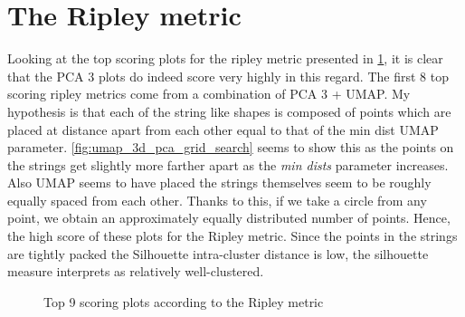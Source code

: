 \documentclass[a4paper, 12pt, twoside]{report}
\begin{document}
\section{The Ripley metric}

Looking at the top scoring plots for the ripley metric presented in \ref{fig:top_ripley}, it is clear that the PCA 3 plots do indeed score very highly in this regard. The first 8 top scoring ripley metrics come from a combination of PCA 3 + UMAP. My hypothesis is that each of the string like shapes is composed of points which are placed at distance apart from each other equal to that of the min dist UMAP parameter. \ref{fig:umap_3d_pca_grid_search} seems to show this as the points on the strings get slightly more farther apart as the \textit{min dists} parameter increases. Also UMAP seems to have placed the strings themselves seem to be roughly equally spaced from each other. Thanks to this, if we take a circle from any point, we obtain an approximately equally distributed number of points. Hence, the high score of these plots for the Ripley metric. Since the points in the strings are tightly packed the Silhouette intra-cluster distance is low, the silhouette measure interprets as relatively well-clustered.

\begin{figure}[h!tbp]
\centering
{}
\caption{Top 9 scoring plots according to the Ripley metric}
\label{fig:top_ripley}
\end{figure}
\end{document}
